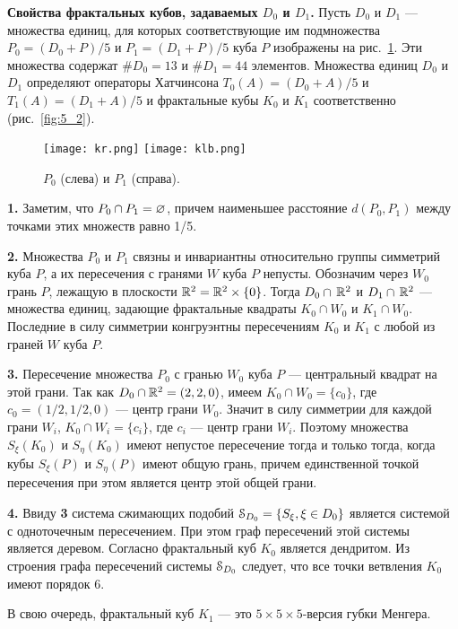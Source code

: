 {\bf Свойства фрактальных кубов, задаваемых $ D_0$ и  $ D_1$.}
Пусть $ D_0$ и $ D_1$ --- множества единиц, для которых соответствующие им подмножества $P_0=( D_0+P)/5$  и $P_1=( D_1+P)/5$ куба $P$ изображены на рис.~\ref{fig:5_1}. 
Эти множества содержат $\# D_0=13$ и $\# D_1= 44$ элементов.
 Множества единиц $ D_0$ и $ D_1$ определяют операторы Хатчинсона $ T_0(A)=( D_0+A)/{5}$   и $T_1(A)=( D_1+A)/{5}$   и фрактальные кубы $K_0$ и $K_1$ соответственно (рис.~\ref{fig:5_2}).

\begin{figure}[H]
\centering
\qquad
\texttt{[image: kr.png]}
\hfill
\texttt{[image: klb.png]}
\qquad
\caption{ $P_0$ (слева)  и $P_1$ (справа).}
\label{fig:5_1}
\end{figure}


{\bf 1.} Заметим, что $P_0\cap P_1=\varnothing$, причем наименьшее расстояние $d(P_0,P_1)$ между точками этих множеств  равно 1/5.\smallskip

{\bf 2.} Множества $P_0$ и $P_1$ связны  и  инвариантны относительно группы симметрий куба $P$,  а их пересечения с гранями $W$ куба $P$ непусты. 
Обозначим через $W_0$   грань  $P$, лежащую в плоскости $\mathbb{R}^2=\mathbb{R}^2\times\{0\}$. 
Тогда $ D_0\cap\, \mathbb{R}^2$ и $ D_1\cap\, \mathbb{R}^2$ --- множества единиц, задающие фрактальные квадраты $K_0\cap W_0$ и $K_1\cap W_0$. 
Последние в силу симметрии конгруэнтны пересечениям $K_0$ и $K_1$ с любой из граней $W$ куба $P$.\smallskip

{\bf 3.} Пересечение множества $P_0$  с гранью $W_0$ куба $P$ --- центральный квадрат  на этой грани. 
Так как $ D_0\cap \mathbb{R}^2=(2,2,0)$,  имеем $K_0\cap W_0=\{c_0\} $, где $c_0=(1/2,1/2,0)$ --- центр грани $W_0$. 
Значит в силу симметрии для каждой грани $W_i$,  $K_0\cap W_i=\{c_i\} $, где $c_i$ --- центр грани $W_i$. 
Поэтому множества $S_\xi(K_0)$ и $S_\eta(K_0)$ имеют непустое пересечение тогда и только тогда, когда кубы  $S_\xi(P)$ и $S_\eta(P)$ имеют общую грань, причем   единственной точкой пересечения при этом является центр этой общей грани.\smallskip

{\bf 4.} Ввиду {\bf 3} система сжимающих подобий ${\EuScript S}_{ D_0}=\{S_\xi,\xi\in  D_0\}$ является системой с одноточечным пересечением. 
При этом  граф пересечений этой системы является деревом. 
Согласно \cite[Theorem 1.7]{FIP} фрактальный куб $K_0$ является дендритом.
Из строения графа пересечений системы ${\EuScript S}_{ D_0}$ следует, что  все точки ветвления $K_0$ имеют порядок 6.\smallskip

В свою очередь, фрактальный куб $ K_1$ --- это $ 5\times 5\times 5 $-версия губки Менгера.


